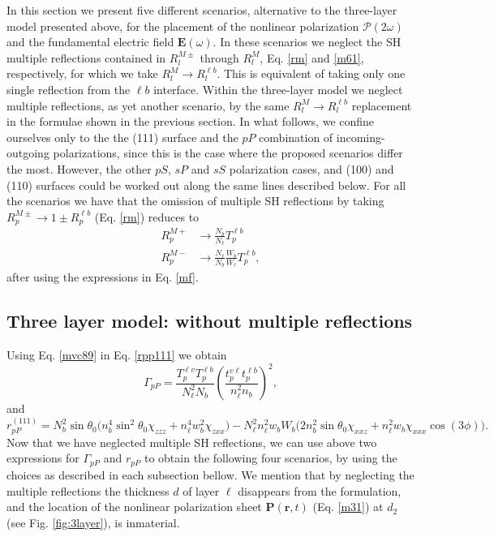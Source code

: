 In this section we present five different scenarios, alternative to the
three-layer model presented above, for the placement of the nonlinear
polarization $\boldsymbol{\mathcal{P}}(2\omega)$ and the fundamental
electric field $\mathbf{E}(\omega)$. In these scenarios we neglect the SH
multiple reflections contained in $R^{M\pm}_{l}$ through $R^{M}_{l}$, Eq.
\eqref{rm} and \eqref{m61}, respectively, for which we take $R^{M}_{l}\to
R^{\ell b}_{l}$. This is equivalent of taking only one single reflection from
the $\ell b$ interface. Within the three-layer model we neglect multiple
reflections, as yet another scenario, by the same $R^{M}_{l}\to R^{\ell b}_{l}$
replacement in the formulae shown in the previous section. In what follows, we
confine ourselves only to the the (111) surface and the $pP$ combination of
incoming-outgoing polarizations, since this is the case where the proposed
scenarios differ the most. However, the other $pS$, $sP$ and $sS$ polarization
cases, and (100) and (110) surfaces could be worked out along the same lines
described below. For all the scenarios we have that the omission of multiple SH
reflections by taking $R^{M\pm}_{p}\to 1\pm R^{\ell b}_{p}$ (Eq. \eqref{rm})
reduces to
\begin{align}\label{mvc89}
R^{M+}_{p}&\to\frac{N_{b}}{N_{\ell}}T^{\ell b}_{p}\nonumber\\
R^{M-}_{p}&\to\frac{N_{\ell}}{N_{b}}\frac{W_{b}}{W_{\ell}}T^{\ell b}_{p},
\end{align}
after using the expressions in Eq. \eqref{mf}.



\subsection{Three layer model: without multiple reflections}\label{sec:nomr}

Using Eq. \eqref{mvc89} in Eq. \eqref{rpp111} we obtain
\begin{equation}\label{m79}
\Gamma_{pP}=
\frac{T_{p}^{\ell v}T^{\ell b}_{p}}
     {N^{2}_{\ell}N_{b}}
\left(
\frac{t_{p}^{v\ell}t^{\ell b}_{p}}
     {n^{2}_{\ell}n_{b}}
\right)^{2},  
\end{equation}
and
\begin{equation}\label{m81}
r^{(111)}_{pP} =
N^{2}_{b}\sin\theta_{0}
\Big(
  n^{4}_{b}\sin^2\theta_{0}\chi_{zzz}
+ n^{4}_{\ell}w^2_{b}\chi_{zxx}
\Big)
- N^{2}_{\ell}n^{2}_{\ell}w_{b}W_{b}
\Big(
  2n^{2}_{b}\sin\theta_{0}\chi_{xxz}
+ n^{2}_{\ell}w_{b}\chi_{xxx}\cos(3\phi) 
\Big).
\end{equation}
Now that we have neglected multiple SH reflections, we can use above two
expressions for $\Gamma_{pP}$ and $r_{pP}$ to obtain the following four
scenarios, by using the choices as described in each subsection bellow. We
mention that by neglecting the multiple reflections the thickness $d$ of layer
$\ell$ disappears from the formulation, and the location of the nonlinear
polarization sheet $\mathbf{P}(\mathbf{r},t)$ (Eq. \eqref{m31}) at 
$d_{2}$ (see Fig. \ref{fig:3layer}), is inmaterial.

